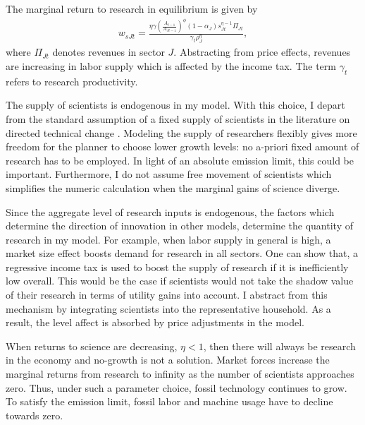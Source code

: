 The marginal return to research in equilibrium is  given by
\begin{align}
w_{sJt}= \frac{\eta \gamma \left(\frac{A_{t-1}}{A_{Jt-1}}\right)^\phi (1-\alpha_J)s_{Jt}^{\eta-1}\Pi_{Jt}}{\gamma_{t}\rho_J^\eta},
\end{align}
where $\Pi_{Jt}$ denotes revenues in sector $J$. Abstracting from price effects, revenues are increasing in labor supply which is affected by the income tax. The term $\gamma_{t}$ refers to research productivity.

The supply of scientists is endogenous in my model. With this choice, I depart from the standard assumption of a fixed supply of scientists in the literature on directed technical change \citep{Acemoglu2012TheChange, Fried2018ClimateAnalysis}.  Modeling the supply of researchers flexibly gives more freedom for the planner to choose lower growth levels: no a-priori fixed amount of research has to be employed. In light of an absolute emission limit, this could be important. Furthermore, I do not assume free movement of scientists which simplifies the numeric calculation when the marginal gains of science diverge. 

Since the aggregate level of research inputs is endogenous, the factors which determine the direction of innovation in other models, determine the quantity of research in my model. For example, when labor supply in general is high, a market size effect boosts demand for research in all sectors. One can show that, a regressive income tax is used to boost the supply of research if it is inefficiently low overall. This would be the case if scientists would not take the  shadow value of their research in terms of utility gains into account. I abstract from this mechanism by integrating scientists into the representative household. As a result, the level affect is absorbed by price adjustments in the model.

When returns to science are decreasing, $\eta<1$, then there will always be research in the economy and no-growth is not a solution. Market forces increase the marginal returns from research to infinity as the number of scientists approaches zero. Thus, under such a parameter choice, fossil technology continues to grow. To satisfy the emission limit, fossil labor and machine usage have to decline towards zero. 




